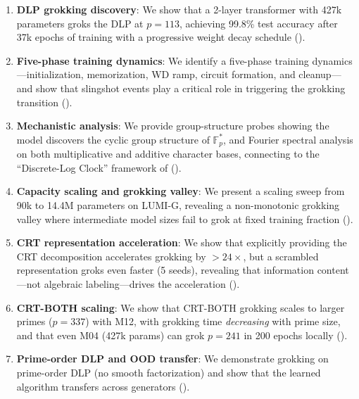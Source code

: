 \documentclass[11pt]{article}
\newcommand{\Fps}{\mathbb{F}_p^*}
\begin{document}
\begin{enumerate}[leftmargin=*]
    \item \textbf{DLP grokking discovery}: We show that a 2-layer transformer with 427k parameters groks the DLP at $p = 113$, achieving 99.8\% test accuracy after 37k epochs of training with a progressive weight decay schedule ().
    
    \item \textbf{Five-phase training dynamics}: We identify a five-phase training dynamics---initialization, memorization, WD ramp, circuit formation, and cleanup---and show that slingshot events \citep{thilak2022slingshot} play a critical role in triggering the grokking transition ().
    
    \item \textbf{Mechanistic analysis}: We provide group-structure probes showing the model discovers the cyclic group structure of $\Fps$, and Fourier spectral analysis on both multiplicative and additive character bases, connecting to the ``Discrete-Log Clock'' framework of \citet{doshi2024discrete} ().
    
    \item \textbf{Capacity scaling and grokking valley}: We present a scaling sweep from 90k to 14.4M parameters on LUMI-G, revealing a non-monotonic grokking valley where intermediate model sizes fail to grok at fixed training fraction ().
    
    \item \textbf{CRT representation acceleration}: We show that explicitly providing the CRT decomposition accelerates grokking by $>24\times$, but a scrambled representation groks even faster (5 seeds), revealing that information content---not algebraic labeling---drives the acceleration ().
    
    \item \textbf{CRT-BOTH scaling}: We show that CRT-BOTH grokking scales to larger primes ($p = 337$) with M12, with grokking time \emph{decreasing} with prime size, and that even M04 (427k params) can grok $p = 241$ in 200 epochs locally ().
    
    \item \textbf{Prime-order DLP and OOD transfer}: We demonstrate grokking on prime-order DLP (no smooth factorization) and show that the learned algorithm transfers across generators ().
\end{enumerate}
\end{document}
